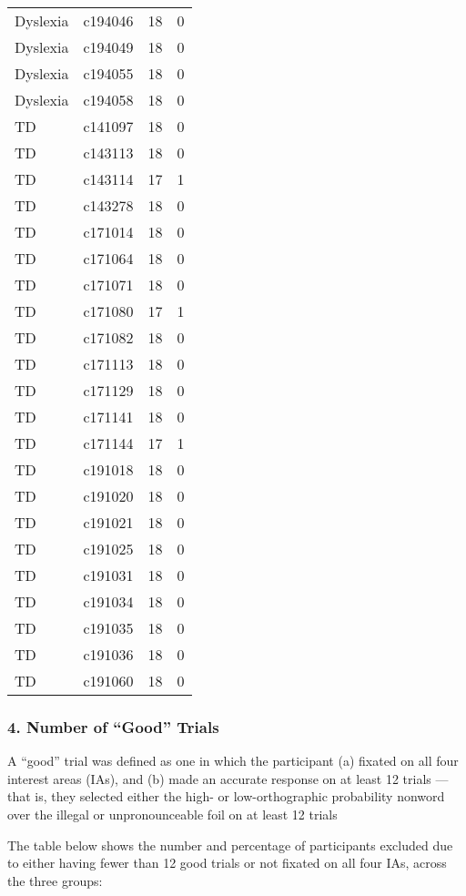 \documentclass[
]{article}
\begin{document}
\begin{table}[t]
\begin{tabular*}{\linewidth}{@{\extracolsep{\fill}}llrr}
Dyslexia & c194046 & 18 & 0 \\ 
Dyslexia & c194049 & 18 & 0 \\ 
Dyslexia & c194055 & 18 & 0 \\ 
Dyslexia & c194058 & 18 & 0 \\ 
TD & c141097 & 18 & 0 \\ 
TD & c143113 & 18 & 0 \\ 
TD & c143114 & 17 & 1 \\ 
TD & c143278 & 18 & 0 \\ 
TD & c171014 & 18 & 0 \\ 
TD & c171064 & 18 & 0 \\ 
TD & c171071 & 18 & 0 \\ 
TD & c171080 & 17 & 1 \\ 
TD & c171082 & 18 & 0 \\ 
TD & c171113 & 18 & 0 \\ 
TD & c171129 & 18 & 0 \\ 
TD & c171141 & 18 & 0 \\ 
TD & c171144 & 17 & 1 \\ 
TD & c191018 & 18 & 0 \\ 
TD & c191020 & 18 & 0 \\ 
TD & c191021 & 18 & 0 \\ 
TD & c191025 & 18 & 0 \\ 
TD & c191031 & 18 & 0 \\ 
TD & c191034 & 18 & 0 \\ 
TD & c191035 & 18 & 0 \\ 
TD & c191036 & 18 & 0 \\ 
TD & c191060 & 18 & 0 \\ 
\bottomrule
\end{tabular*}
\end{table}

\subsubsection{4. Number of ``Good''
Trials}\label{number-of-good-trials}

A ``good'' trial was defined as one in which the participant (a) fixated
on all four interest areas (IAs), and (b) made an accurate response on
at least 12 trials --- that is, they selected either the high- or
low-orthographic probability nonword over the illegal or unpronounceable
foil on at least 12 trials

The table below shows the number and percentage of participants excluded
due to either having fewer than 12 good trials or not fixated on all
four IAs, across the three groups:
\end{document}
